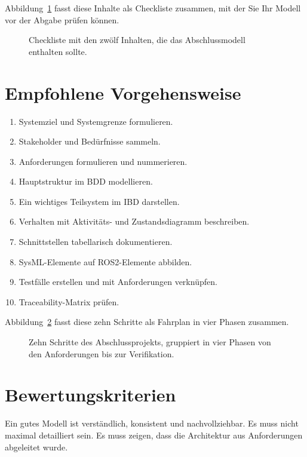 Abbildung~\ref{fig:kap21-checkliste-abschlussmodell} fasst diese Inhalte als Checkliste zusammen, mit der Sie Ihr Modell vor der Abgabe prüfen können.

\begin{figure}[H]
  \centering
  \caption{Checkliste mit den zwölf Inhalten, die das Abschlussmodell enthalten sollte.}
  \label{fig:kap21-checkliste-abschlussmodell}
\end{figure}

\section{Empfohlene Vorgehensweise}
\begin{enumerate}
    \item Systemziel und Systemgrenze formulieren.
    \item Stakeholder und Bedürfnisse sammeln.
    \item Anforderungen formulieren und nummerieren.
    \item Hauptstruktur im BDD modellieren.
    \item Ein wichtiges Teilsystem im IBD darstellen.
    \item Verhalten mit Aktivitäts- und Zustandsdiagramm beschreiben.
    \item Schnittstellen tabellarisch dokumentieren.
    \item SysML-Elemente auf ROS2-Elemente abbilden.
    \item Testfälle erstellen und mit Anforderungen verknüpfen.
    \item Traceability-Matrix prüfen.
\end{enumerate}

Abbildung~\ref{fig:kap21-projektfahrplan} fasst diese zehn Schritte als Fahrplan in vier Phasen zusammen.

\begin{figure}[H]
  \centering
  \caption{Zehn Schritte des Abschlussprojekts, gruppiert in vier Phasen von den Anforderungen bis zur Verifikation.}
  \label{fig:kap21-projektfahrplan}
\end{figure}

\section{Bewertungskriterien}
Ein gutes Modell ist verständlich, konsistent und nachvollziehbar. Es muss nicht maximal detailliert sein. Es muss zeigen, dass die Architektur aus Anforderungen abgeleitet wurde.

